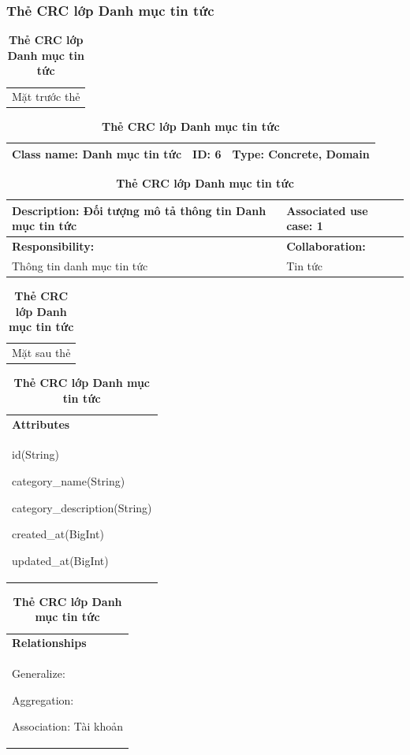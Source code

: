   \subsubsection{Thẻ CRC lớp Danh mục tin tức}
  \begin{table}[H]
    \caption{\bfseries \fontsize{12pt}{0pt}\selectfont Thẻ CRC lớp Danh mục tin tức}
    \centering
    \begin{tabularx}{0.9\textwidth}{X}
      Mặt trước thẻ
    \end{tabularx}
    \begin{tabularx}{0.9\textwidth}{|X|X|X|}
      \hline
      \textbf{Class name:} Danh mục tin tức & \textbf{ID:} 6 & \textbf{Type:} Concrete, Domain \\
      \hline
    \end{tabularx}
    \begin{tabularx}{0.9\textwidth}{|X|X|}
      \textbf{Description:} Đối tượng mô tả thông tin Danh mục tin tức & \textbf{Associated use case:} 1 \\
      \hline
      \textbf{Responsibility:} & \textbf{Collaboration:} \\
      Thông tin danh mục tin tức
      & 
      Tin tức
      \\
      \hline
    \end{tabularx}
    \begin{tabularx}{0.9\textwidth}{X}
      Mặt sau thẻ
    \end{tabularx}
    \begin{tabularx}{0.9\textwidth}{|X|}
      \hline
      \textbf{Attributes} \\
      id(String) 
      
      category\_name(String)

      category\_description(String)

      created\_at(BigInt)

      updated\_at(BigInt)
      \\
      \hline
    \end{tabularx}
    \begin{tabularx}{0.9\textwidth}{|X|}
      \textbf{Relationships} \\
      Generalize:  

      Aggregation:  
      
      Association: Tài khoản 
      \\
      \hline
    \end{tabularx}
  \end{table}

